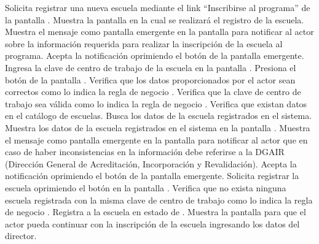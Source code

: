  \begin{UCtrayectoria}
    \UCpaso[\UCactor] Solicita registrar una nueva escuela mediante el link ``Inscribirse al programa'' de la pantalla .
    \UCpaso[\UCsist] Muestra la pantalla  en la cual se realizará el registro de la escuela.
    \UCpaso[\UCsist] Muestra el mensaje  como pantalla emergente en la pantalla  
		      para notificar al actor sobre la información requerida para realizar la inscripción de la escuela al programa.
    \UCpaso[\UCactor] Acepta la notificación oprimiendo el botón  de la pantalla emergente.
    \UCpaso[\UCactor] Ingresa la clave de centro de trabajo de la escuela en la pantalla . \label{cur3:Acciones}
    \UCpaso[\UCactor] Presiona el botón \botBus de la pantalla .
    \UCpaso[\UCsist] Verifica que los datos proporcionados por el actor sean correctos como lo indica la regla de negocio .   
    \UCpaso[\UCsist] Verifica que la clave de centro de trabajo sea válida como lo indica la regla de negocio . 
    \UCpaso[\UCsist] Verifica que existan datos en el catálogo de escuelas. 
    \UCpaso[\UCsist] Busca los datos de la escuela registrados en el sistema. 
    \UCpaso[\UCsist] Muestra los datos de la escuela registrados en el sistema en la pantalla .
    \UCpaso[\UCsist] Muestra el mensaje  como pantalla emergente en la pantalla  para notificar al actor que en caso de haber inconsistencias en la información debe referirse a la DGAIR (Dirección General de Acreditación, Incorporación y Revalidación).
    \UCpaso[\UCactor] Acepta la notificación oprimiendo el botón  de la pantalla emergente.
    \UCpaso[\UCactor] Solicita registrar la escuela oprimiendo el botón  en la pantalla . 
    \UCpaso[\UCsist] Verifica que no exista ninguna escuela registrada con la misma clave de centro de trabajo como lo indica la regla de negocio . 
    \UCpaso[\UCsist] Registra a la escuela en estado  de .
    \UCpaso[\UCsist] Muestra la pantalla  para que el actor pueda continuar con la inscripción de la escuela ingresando los datos del director.
 \end{UCtrayectoria}
 
